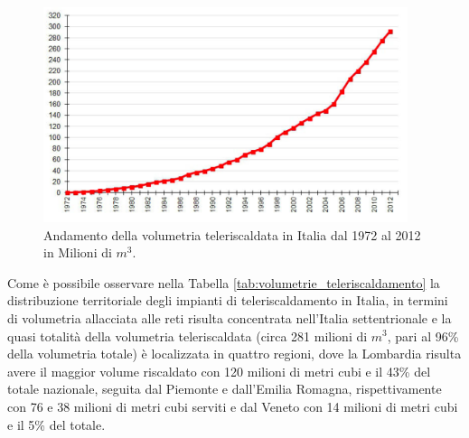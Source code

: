 \documentclass[laurea,oneside,11pt]{USiena_tesiLM}
\begin{document}
\begin{figure}[!ht]
\centering
\includegraphics[width=0.95\textwidth]{figure/volumetria_teleriscaldata} 
\caption{Andamento della volumetria teleriscaldata in Italia dal 1972 al 2012 in Milioni di $m^3$.}
\label{fig:volumetria_teleriscaldata}
\end{figure}

Come è possibile osservare nella Tabella \ref{tab:volumetrie_teleriscaldamento} la distribuzione territoriale degli impianti di teleriscaldamento in Italia, in termini di volumetria allacciata alle reti risulta concentrata nell'Italia settentrionale e la quasi totalità della volumetria teleriscaldata (circa 281 milioni di $m^3$, pari al 96\% della volumetria totale) è localizzata in quattro regioni, dove la Lombardia risulta avere il maggior volume riscaldato con 120 milioni di metri cubi e il 43\% del totale nazionale, seguita dal Piemonte e dall'Emilia Romagna, rispettivamente con 76 e 38 milioni di metri cubi serviti e dal Veneto con 14 milioni di metri cubi e il 5\% del totale.
\end{document}

